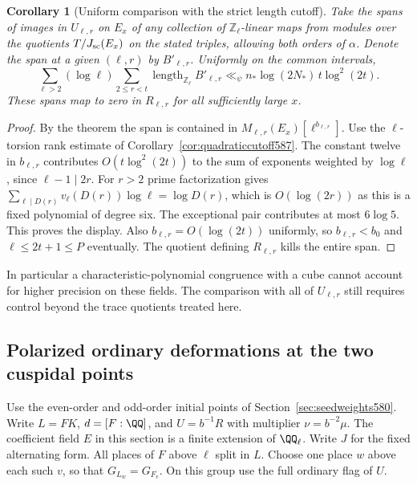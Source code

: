 \documentclass[a4paper,11pt]{article}
\newtheorem{corollary}[proposition]{Corollary}
\theoremstyle{definition}
\theoremstyle{remark}
\newcommand{\ZZ}{\mathbb Z}\newcommand{\ord}{\operatorname{ord}}
\numberwithin{equation}{section}
\begin{document}
\begin{corollary}[Uniform comparison with the strict length cutoff]
\leavevmode\label{cor:unorderedcutoff588}
Take the spans of images in \(U_{\ell,r}\) on \(E_x\) of
any collection of \(\ZZ_\ell\)-linear maps from modules
over the quotients \(T/J_{\rm sc}(E_x)\) on the stated
triples, allowing both orders of \(\alpha\). Denote the
span at a given \((\ell,r)\) by \(B'_{\ell,r}\). Uniformly
on the common intervals,
\[
    \sum_{\ell>2}(\log\ell)\sum_{2\le r<t}
          \operatorname{length}_{\ZZ_\ell}B'_{\ell,r}
       \ll_\psi n_*\log(2N_*)\,t\log^2(2t).
\]
These spans map to zero in \(R_{\ell,r}\) for all sufficiently
large \(x\).
\end{corollary}
\begin{proof}
By the theorem the span is contained in
\(M_{\ell,r}(E_x)[\ell^{b_{\ell,r}}]\). Use the
\(\ell\)-torsion rank estimate of
Corollary~\ref{cor:quadraticcutoff587}. The constant twelve
in \(b_{\ell,r}\) contributes \(O(t\log^2(2t))\) to the
sum of exponents weighted by \(\log\ell\), since
\(\ell-1\mid2r\). For \(r>2\) prime factorization gives
\(\sum_{\ell\mid D(r)}v_\ell(D(r))\log\ell=\log D(r)\),
which is \(O(\log(2r))\) as this is a fixed polynomial of
degree six. The exceptional pair contributes at most
\(6\log5\). This proves the display. Also
\(b_{\ell,r}=O(\log(2t))\) uniformly, so
\(b_{\ell,r}<b_0\) and \(\ell\le2t+1\le P\) eventually.
The quotient defining \(R_{\ell,r}\) kills the entire span.
\end{proof}

In particular a characteristic-polynomial congruence with
a cube cannot account for higher precision on these fields.
The comparison with all of \(U_{\ell,r}\) still requires
control beyond the trace quotients treated here.


\subsection{Polarized ordinary deformations at the two cuspidal points}
\label{sec:polarweights593}

Use the even-order and odd-order initial points of
Section~\ref{sec:seedweights580}. Write \(L=FK\), \(d=[F:\QQ]\),
and \(U=b^{-1}R\) with multiplier \(\nu=b^{-2}\mu\).
The coefficient field \(E\) in this section is a finite
extension of \(\QQ_\ell\). Write \(J\) for the fixed alternating
form. All places of \(F\) above \(\ell\) split in \(L\).
Choose one place \(w\) above each such \(v\), so that
\(G_{L_w}=G_{F_v}\). On this group use the full ordinary flag
of \(U\).
\end{document}
